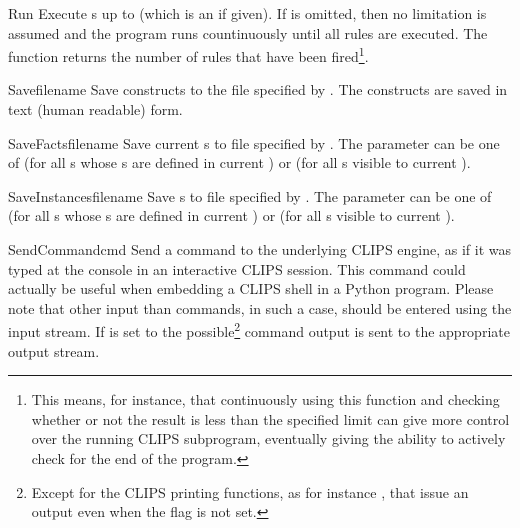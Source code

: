 \begin{funcdesc}{Run}{}
Execute s up to  (which is an  if
given). If  is omitted, then no limitation is assumed and the
program runs countinuously until all rules are executed. The function
returns the number of rules that have been fired\footnote{This means,
for instance, that continuously using this function and checking whether
or not the result is less than the specified limit can give more control
over the running CLIPS subprogram, eventually giving the ability to
actively check for the end of the program.}.
\end{funcdesc}

\begin{funcdesc}{Save}{filename}
Save constructs to the file specified by . The constructs are
saved in text (human readable) form.
\end{funcdesc}

\begin{funcdesc}{SaveFacts}{filename }
Save current s to file specified by . The
 parameter can be one of  (for all
s whose s are defined in current
) or  (for all s
visible to current ).
\end{funcdesc}

\begin{funcdesc}{SaveInstances}{filename }
Save s to file specified by . The
 parameter can be one of  (for all
s whose s are defined in current
) or  (for all s
visible to current ).
\end{funcdesc}

\begin{funcdesc}{SendCommand}{cmd }
Send a command to the underlying CLIPS engine, as if it was typed at the
console in an interactive CLIPS session. This command could actually be
useful when embedding a CLIPS shell in a Python program. Please note that
other input than commands, in such a case, should be entered using the
 input stream. If  is set to 
the possible\footnote{Except for the CLIPS printing functions, as for
instance , that issue an output even when the flag is not
set.} command output is sent to the appropriate output stream.
\end{funcdesc}

